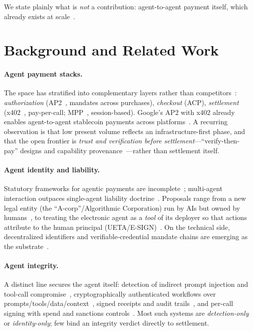 \documentclass[11pt]{article}
\begin{document}
We state plainly what is \emph{not} a contribution: agent-to-agent payment itself, which already
exists at scale~\citep{googlex402,a2ax402,landscape}.

\section{Background and Related Work}
\label{sec:related}

\paragraph{Agent payment stacks.} The space has stratified into complementary layers rather than
competitors~\citep{landscape,cryptorefills}: \emph{authorization} (AP2~\citep{ap2google,ap2auth},
mandates across purchases), \emph{checkout} (ACP), \emph{settlement} (x402~\citep{x402coinbase},
pay-per-call; MPP~\citep{turnkey}, session-based). Google's AP2 with x402 already enables
agent-to-agent stablecoin payments across platforms~\citep{googlex402,a2ax402}. A recurring
observation is that low present volume reflects an infrastructure-first phase, and that the open
frontier is \emph{trust and verification before settlement}---``verify-then-pay'' designs and
capability provenance~\citep{tesspay,cpmm,tokenrelations}---rather than settlement itself.

\paragraph{Agent identity and liability.} Statutory frameworks for agentic payments are
incomplete~\citep{goodwin}; multi-agent interaction outpaces single-agent liability
doctrine~\citep{btlj}. Proposals range from a new legal entity (the ``A-corp''/Algorithmic
Corporation) run by AIs but owned by humans~\citep{clsbluesky,countais}, to treating the
electronic agent as a \emph{tool} of its deployer so that actions attribute to the human
principal (UETA/E-SIGN)~\citep{ueta}. On the technical side, decentralized identifiers and
verifiable-credential mandate chains are emerging as the substrate~\citep{aip,tiva,ap2auth}.

\paragraph{Agent integrity.} A distinct line secures the agent itself: detection of indirect
prompt injection and tool-call compromise~\citep{agentshield,onesec}, cryptographically
authenticated workflows over prompts/tools/data/context~\citep{authworkflows}, signed receipts
and audit trails~\citep{notarized}, and per-call signing with spend and sanctions
controls~\citep{stripemcps}. Most such systems are \emph{detection-only} or \emph{identity-only};
few bind an integrity verdict directly to settlement.
\end{document}
